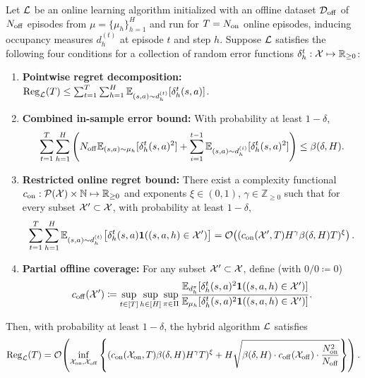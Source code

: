 \begin{prop}
\label{prop:ch02-general_recipe}
Let ${\mathcal{L}}$ be an online learning algorithm initialized with an offline dataset ${\mathcal{D}}_{{\operatorname{off}}}$ of $N_{{\operatorname{off}}}$ episodes from $\mu = \{\mu_h\}_{h=1}^H$ and run for $T = N_{{\operatorname{on}}}$ online episodes, inducing occupancy measures $d_h^{(t)}$ at episode $t$ and step $h$. Suppose ${\mathcal{L}}$ satisfies the following four conditions for a collection of random error functions $\delta_h^t : {\mathcal{X}} \mapsto {\mathbb{R}}_{\geq 0}$:
\begin{enumerate}
    \item \textbf{Pointwise regret decomposition:} $\operatorname{Reg}_{{\mathcal{L}}}(T) \leq \sum_{t = 1}^T \sum_{h = 1}^H \mathbb{E}_{(s, a) \sim d^{(t)}_h}[\delta_h^{t}(s, a)]$.
    \item \textbf{Combined in-sample error bound:} With probability at least $1-\delta$,
    \begin{equation}
        \sum_{t = 1}^T \sum_{h = 1}^H \left(N_{{\operatorname{off}}} \mathbb{E}_{(s, a) \sim \mu_h}[\delta_h^t(s, a)^2] + \sum_{i = 1}^{t-1} \mathbb{E}_{(s, a) \sim d^{(i)}_h}[ \delta_h^{t}(s, a)^2]\right) \leq \beta(\delta, H).
    \end{equation}
    \item \textbf{Restricted online regret bound:} There exist a complexity functional $c_{{\operatorname{on}}}: {\mathcal{P}}({\mathcal{X}}) \times {\mathbb{N}} \mapsto {\mathbb{R}}_{\geq 0}$ and exponents $\xi \in (0, 1)$, $\gamma \in \mathbb{Z}_{\geq 0}$ such that for every subset ${\mathcal{X}}' \subset {\mathcal{X}}$, with probability at least $1-\delta$,
    \begin{equation}
        \sum_{t = 1}^T \sum_{h = 1}^H \mathbb{E}_{(s, a) \sim d^{(t)}_h}\!\left[\delta_h^t(s, a) \mathbf{1}((s, a, h) \in {\mathcal{X}}')\right] = {\mathcal{O}}\!\left((c_{{\operatorname{on}}}({\mathcal{X}}', T) H^{\gamma} \beta(\delta, H) T)^{\xi}\right).
    \end{equation}
    \item \textbf{Partial offline coverage:} For any subset ${\mathcal{X}}' \subset {\mathcal{X}}$, define (with $0/0 \coloneqq 0$)
    \begin{equation}
        c_{{\operatorname{off}}}({\mathcal{X}}') \coloneqq \sup_{t \in [T]} \sup_{h \in [H]} \sup_{\pi \in \Pi} \frac{\mathbb{E}_{d_h^{\pi}}[\delta_h^t(s, a)^2 \mathbf{1}((s,a,h) \in {\mathcal{X}}')]}{\mathbb{E}_{\mu_h}[\delta_h^t(s, a)^2 \mathbf{1}((s,a,h) \in {\mathcal{X}}')]}.
    \end{equation}
\end{enumerate}
Then, with probability at least $1-\delta$, the hybrid algorithm ${\mathcal{L}}$ satisfies
\begin{equation}
    \operatorname{Reg}_{{\mathcal{L}}}(T) = {\mathcal{O}}\!\left(\inf_{{\mathcal{X}}_{{\operatorname{on}}}, {\mathcal{X}}_{{\operatorname{off}}}}\left\{(c_{{\operatorname{on}}}({\mathcal{X}}_{{\operatorname{on}}}, T) \beta(\delta, H)H^\gamma T)^{\xi}  + H \sqrt{\beta(\delta, H) \cdot c_{{\operatorname{off}}}({\mathcal{X}}_{{\operatorname{off}}})\cdot \frac{N_{{\operatorname{on}}}^2}{N_{{\operatorname{off}}}}}\right\}\right).
\end{equation}
\end{prop}

